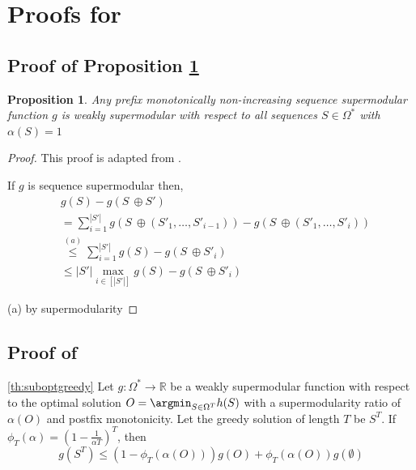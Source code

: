 \documentclass{article} %
\newtheorem{proposition}[theorem]{Proposition}
\begin{document}
\section{Proofs for } \label{sec:proofgreedy}

\subsection{Proof of Proposition \ref{th:alpha=1}} \label{sec:proofalpha=1}

\begin{proposition} \label{th:alpha=1}
    Any prefix monotonically non-increasing sequence supermodular function $g$ is weakly supermodular with respect to all sequences $S \in \Omega^*$ with $\alpha(S) = 1$
\end{proposition}

\begin{proof}

This proof is adapted from \citet{liberty2017greedy}.

If $g$ is sequence supermodular then,
\begin{align*}
    &g(S) - g(S \ \oplus S' ) \\
    &= \sum_{i = 1}^{|S'|} g(S \ \oplus \left(S'_1, \dots, S'_{i - 1}\right)) - g(S \ \oplus \left(S'_1, \dots, S'_{i}\right)) \\
    &\overset{(a)}{\leq} \sum_{i = 1}^{|S'|} g(S) - g(S \ \oplus  S'_{i}) \\
    &\leq |S'|\max_{i \in [|S'|]} g(S) - g(S \ \oplus  S'_{i})
\end{align*}

(a) by supermodularity


\end{proof}

\subsection{Proof of } \label{sec:proofsuboptgreedy}



\begin{customtheorem}{\ref{th:suboptgreedy}}
    Let $g: \Omega^* \to \mathbb{R}$ be a weakly supermodular function with respect to the optimal solution $O = \argmin_{S \in \Omega^T} h(S)$ with a supermodularity ratio of $\alpha(O)$ and 
    postfix monotonicity. Let the greedy solution of length $T$ be $S^T$. If $\phi_T(\alpha) =  \left(1 - \frac{1}{\alpha T}\right)^T$, then
    \begin{equation*}
        g(S^T) \leq  \left(1 - \phi_T(\alpha(O))\right)
        g(O) +  \phi_T(\alpha(O))g(\emptyset)
    \end{equation*}
\end{customtheorem}
\end{document}
